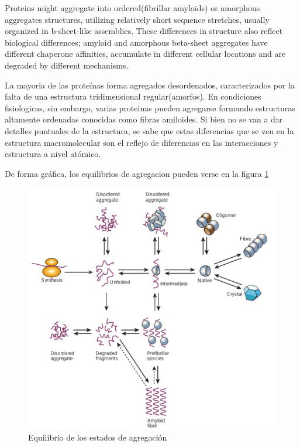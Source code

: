 
Proteins might aggregate into ordered(fibrillar amyloids) or amorphous aggregates structures, utilizing relatively short sequence stretches, usually organized in b-sheet-like assemblies. 
These differences in structure also reflect biological differences; amyloid and amorphous beta-sheet aggregates have different chaperone affinities, accumulate in different cellular locations and are degraded by different mechanisms.

La mayoria de las proteínas forma agregados desordenados, caracterizados por la falta de una estructura tridimensional regular(amorfos).
En condiciones fisiologicas, sin embargo, varias proteinas pueden agregarse formando estructuras altamente ordenadas conocidas como fibras amiloides.
Si bien no se van a dar detalles puntuales de la estructura, se sabe que estas diferencias que se ven en la estructura macromolecular son el reflejo de diferencias en las interacciones y estructura a nivel atómico.


De forma gráfica, los equilibrios de agregacion pueden verse en la figura \ref{aggregationDiagram}

\begin{figure}[h!,centered]
\includegraphics[width=\textwidth]{img/aggregationDiagram.png} 
\caption{Equilibrio de los estados de agregación} \label{aggregationDiagram}
\end{figure}



